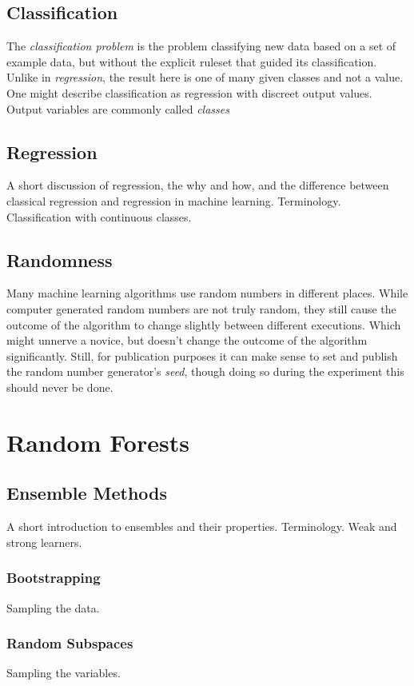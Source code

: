 \documentclass[a4paper,man,12pt,apacite]{apa6} %
\begin{document}
\subsection{Classification}
The \emph{classification problem} is the problem classifying new data based
on a set of example data, but without the explicit ruleset that guided its
classification.
Unlike in \emph{regression}, the result here is one of many given classes
and not a value.
One might describe classification as regression with discreet output values.
Output variables are commonly called \emph{classes}

\subsection{Regression}
A short discussion of regression, the why and how, and the difference
between classical regression and regression in machine learning.
Terminology. Classification with continuous classes.

\subsection{Randomness}
Many machine learning algorithms use random numbers in different places.
While computer generated random numbers are not truly random, they still
cause the outcome of the algorithm to change slightly between different
executions.
Which might unnerve a novice, but doesn't change the outcome of the
algorithm significantly.
Still, for publication purposes it can make sense to set and publish the
random number generator's \emph{seed}, though doing so during the experiment
this should never be done.

\section{Random Forests}

\subsection{Ensemble Methods}
A short introduction to ensembles and their properties. Terminology.
Weak and strong learners.

\subsubsection{Bootstrapping}
Sampling the data.

\subsubsection{Random Subspaces}
Sampling the variables.
\end{document}
